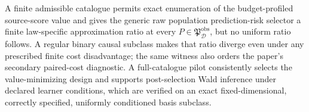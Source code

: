 A finite admissible catalogue permits exact enumeration of the budget-profiled source-score value and gives the generic raw population prediction-risk selector a finite law-specific approximation ratio at every \(P\in\mathfrak P_{\mathcal D}^{\mathrm{obs}}\), but no uniform ratio follows. A regular binary causal subclass makes that ratio diverge even under any prescribed finite cost disadvantage; the same witness also orders the paper's secondary paired-cost diagnostic. A full-catalogue pilot consistently selects the value-minimizing design and supports post-selection Wald inference under declared learner conditions, which are verified on an exact fixed-dimensional, correctly specified, uniformly conditioned basis subclass.